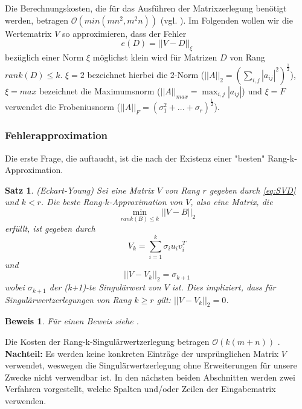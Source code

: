 \documentclass[12pt,a4paper,twoside]{article}
\newtheorem{Satz}{Satz}[section]
\newtheorem{Beweis}{Beweis}
\begin{document}
		Die Berechnungskosten, die für das Ausführen der Matrixzerlegung benötigt werden, betragen $\mathcal{O}(min(mn^2,m^2n))$ (vgl. \cite{mahoney2008}).
		\newline 
		\newline
		Im Folgenden wollen wir die Wertematrix $V$ so approximieren, dass der Fehler 
		\begin{equation*}
			e(D)=||V-D||_\xi
		\end{equation*}
		bezüglich einer Norm $\xi$ möglichst klein wird für Matrizen $D$ von Rang $rank(D)\leq k$. $\xi=2$ bezeichnet hierbei die 2-Norm ($||A||_2=\left(\sum_{i,j}|a_{ij}|^2\right)^\frac{1}{2}$), $\xi=max$ bezeichnet die Maximumsnorm ($||A||_{max}=\max_{i,j}|a_{ij}|$) und $\xi=F$ verwendet die Frobeniusnorm ($||A||_F=(\sigma_1^2+...+\sigma_r)^\frac{1}{2}$).
		\newline
		\subsubsection{Fehlerapproximation}
		Die erste Frage, die auftaucht, ist die nach der Existenz einer  "besten" Rang-k-Approximation.
		\begin{Satz}{(Eckart-Young)}
			Sei eine Matrix $V$ von Rang $r$ gegeben durch \ref{eq:SVD} und $k<r$. Die beste Rang-$k$-Approximation 
			von $V$, also eine Matrix, die
			\begin{equation*}
				\min_{rank(B)\leq k}||V-B||_2	
			\end{equation*}		
			erfüllt, ist gegeben durch
			\begin{equation*}
				 V_k=\sum_{i=1}^k\sigma_i u_i v_i^T
			\end{equation*}
			und 
			\begin{equation*}
				||V-V_k||_2=\sigma_{k+1}
			\end{equation*}
			wobei $\sigma_{k+1}$ der (k+1)-te Singulärwert von $V$ ist. Dies impliziert, dass für Singulärwertzerlegungen von Rang $k\geq r$ gilt: $||V-V_k||_2=0$.
		\end{Satz}
		\begin{Beweis}
			Für einen Beweis siehe \cite{Golub2013}.
		\end{Beweis}
		Die Kosten der Rang-k-Singulärwertzerlegung betragen $\mathcal{O}(k(m+n))$ \citep{Drineas2006}. \newline
		\newline
		\textbf{Nachteil:} Es werden keine konkreten Einträge der ursprünglichen Matrix $V$ verwendet, weswegen die Singulärwertzerlegung ohne Erweiterungen für unsere Zwecke nicht verwendbar ist.\newline
		\newline
		In den nächsten beiden Abschnitten werden zwei Verfahren vorgestellt, welche Spalten und/oder Zeilen der 
		Eingabematrix verwenden.
\end{document}
